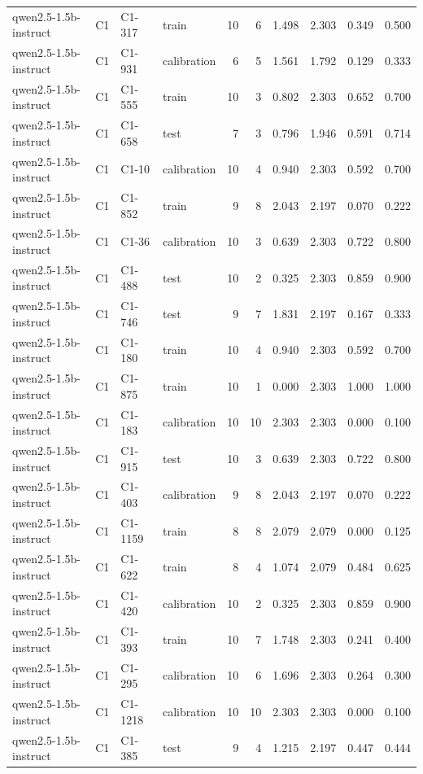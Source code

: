 \begin{table}
\begin{tabular}{llllrrrrrr}
qwen2.5-1.5b-instruct & C1 & C1-317 & train & 10 & 6 & 1.498 & 2.303 & 0.349 & 0.500 \\
qwen2.5-1.5b-instruct & C1 & C1-931 & calibration & 6 & 5 & 1.561 & 1.792 & 0.129 & 0.333 \\
qwen2.5-1.5b-instruct & C1 & C1-555 & train & 10 & 3 & 0.802 & 2.303 & 0.652 & 0.700 \\
qwen2.5-1.5b-instruct & C1 & C1-658 & test & 7 & 3 & 0.796 & 1.946 & 0.591 & 0.714 \\
qwen2.5-1.5b-instruct & C1 & C1-10 & calibration & 10 & 4 & 0.940 & 2.303 & 0.592 & 0.700 \\
qwen2.5-1.5b-instruct & C1 & C1-852 & train & 9 & 8 & 2.043 & 2.197 & 0.070 & 0.222 \\
qwen2.5-1.5b-instruct & C1 & C1-36 & calibration & 10 & 3 & 0.639 & 2.303 & 0.722 & 0.800 \\
qwen2.5-1.5b-instruct & C1 & C1-488 & test & 10 & 2 & 0.325 & 2.303 & 0.859 & 0.900 \\
qwen2.5-1.5b-instruct & C1 & C1-746 & test & 9 & 7 & 1.831 & 2.197 & 0.167 & 0.333 \\
qwen2.5-1.5b-instruct & C1 & C1-180 & train & 10 & 4 & 0.940 & 2.303 & 0.592 & 0.700 \\
qwen2.5-1.5b-instruct & C1 & C1-875 & train & 10 & 1 & 0.000 & 2.303 & 1.000 & 1.000 \\
qwen2.5-1.5b-instruct & C1 & C1-183 & calibration & 10 & 10 & 2.303 & 2.303 & 0.000 & 0.100 \\
qwen2.5-1.5b-instruct & C1 & C1-915 & test & 10 & 3 & 0.639 & 2.303 & 0.722 & 0.800 \\
qwen2.5-1.5b-instruct & C1 & C1-403 & calibration & 9 & 8 & 2.043 & 2.197 & 0.070 & 0.222 \\
qwen2.5-1.5b-instruct & C1 & C1-1159 & train & 8 & 8 & 2.079 & 2.079 & 0.000 & 0.125 \\
qwen2.5-1.5b-instruct & C1 & C1-622 & train & 8 & 4 & 1.074 & 2.079 & 0.484 & 0.625 \\
qwen2.5-1.5b-instruct & C1 & C1-420 & calibration & 10 & 2 & 0.325 & 2.303 & 0.859 & 0.900 \\
qwen2.5-1.5b-instruct & C1 & C1-393 & train & 10 & 7 & 1.748 & 2.303 & 0.241 & 0.400 \\
qwen2.5-1.5b-instruct & C1 & C1-295 & calibration & 10 & 6 & 1.696 & 2.303 & 0.264 & 0.300 \\
qwen2.5-1.5b-instruct & C1 & C1-1218 & calibration & 10 & 10 & 2.303 & 2.303 & 0.000 & 0.100 \\
qwen2.5-1.5b-instruct & C1 & C1-385 & test & 9 & 4 & 1.215 & 2.197 & 0.447 & 0.444 \\

\end{tabular}
\end{table}
